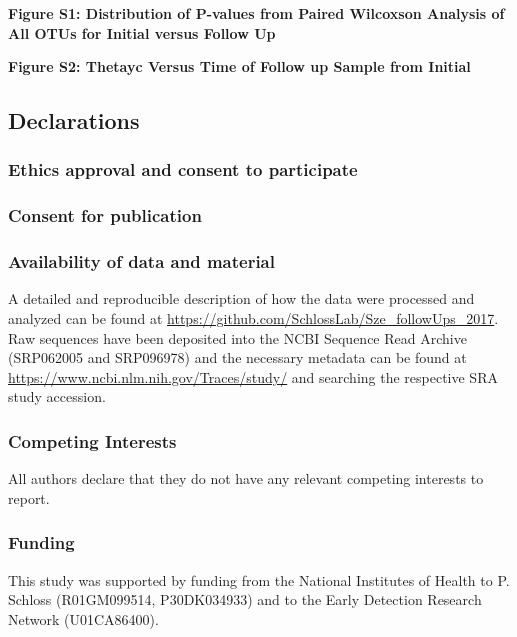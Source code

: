 \documentclass[12pt,]{article}
\begin{document}
\newpage

\textbf{Figure S1: Distribution of P-values from Paired Wilcoxson
Analysis of All OTUs for Initial versus Follow Up}

\textbf{Figure S2: Thetayc Versus Time of Follow up Sample from Initial}

\newpage

\subsection{Declarations}\label{declarations}

\subsubsection{Ethics approval and consent to
participate}\label{ethics-approval-and-consent-to-participate}

\subsubsection{Consent for publication}\label{consent-for-publication}

\subsubsection{Availability of data and
material}\label{availability-of-data-and-material}

A detailed and reproducible description of how the data were processed
and analyzed can be found at
\url{https://github.com/SchlossLab/Sze_followUps_2017}. Raw sequences
have been deposited into the NCBI Sequence Read Archive (SRP062005 and
SRP096978) and the necessary metadata can be found at
\url{https://www.ncbi.nlm.nih.gov/Traces/study/} and searching the
respective SRA study accession.

\subsubsection{Competing Interests}\label{competing-interests}

All authors declare that they do not have any relevant competing
interests to report.

\subsubsection{Funding}\label{funding}

This study was supported by funding from the National Institutes of
Health to P. Schloss (R01GM099514, P30DK034933) and to the Early
Detection Research Network (U01CA86400).
\end{document}
